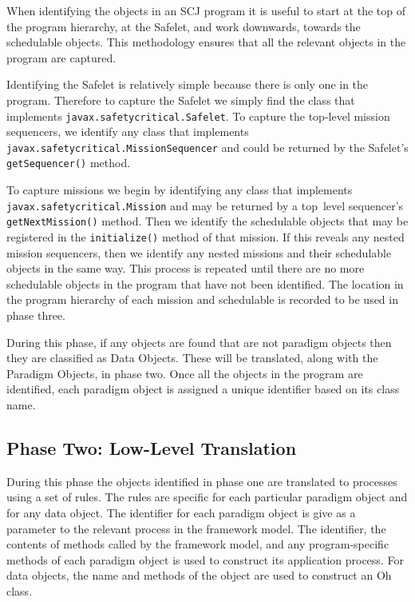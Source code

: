 \documentclass[10pt,a4paper]{article}
\begin{document}
When identifying the objects in an SCJ program it is useful to start at the top of the program hierarchy, at the Safelet, and work downwards, towards the schedulable objects. This methodology ensures that all the relevant objects in the program are captured.

Identifying the Safelet is relatively simple because there is only one in the program. Therefore to capture the Safelet we simply find the class that implements \texttt{javax.safetycritical.Safelet}. To capture the top-level mission sequencers, we identify any class that implements \texttt{javax.safetycritical.MissionSequencer} and could be returned by the Safelet's  \texttt{getSequencer()} method. 

To capture missions we begin by identifying any class that implements \texttt{javax.safetycritical.Mission} and may be returned by a top~level sequencer's \texttt{getNextMission()} method. Then we identify the schedulable objects that may be registered in the \texttt{initialize()} method of that mission. If this reveals any nested mission sequencers, then we identify any nested missions and their schedulable objects in the same way. This process is repeated until there are no more schedulable objects in the program that have not been identified. The location in the program hierarchy of each mission and schedulable is recorded to be used in phase three.

During this phase, if any objects are found that are not paradigm objects then they are classified as Data Objects. These will be translated, along with the Paradigm Objects, in phase two. Once all the objects in the program are identified, each paradigm object is assigned a unique identifier based on its class name.

\subsection{Phase Two: Low-Level Translation}

During this phase the objects identified in phase one are translated to \Circus{} processes using a set of rules. The rules are specific for each particular paradigm object and for any data object. The identifier for each paradigm object is give as a parameter to the relevant process in the framework model. The identifier, the contents of methods called by the framework model, and any program-specific methods of each paradigm object is used to construct its application process. For data objects, the name and methods of the object are used to construct an Oh\Circus{} class. 
\end{document}
